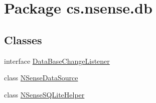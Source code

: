 \hypertarget{namespacecs_1_1nsense_1_1db}{\section{Package cs.\-nsense.\-db}
\label{namespacecs_1_1nsense_1_1db}
}
\subsection*{Classes}
\begin{DoxyCompactItemize}
\item 
interface \hyperlink{interfacecs_1_1nsense_1_1db_1_1_data_base_change_listener}{Data\-Base\-Change\-Listener}
\item 
class \hyperlink{classcs_1_1nsense_1_1db_1_1_n_sense_data_source}{N\-Sense\-Data\-Source}
\item 
class \hyperlink{classcs_1_1nsense_1_1db_1_1_n_sense_s_q_lite_helper}{N\-Sense\-S\-Q\-Lite\-Helper}
\end{DoxyCompactItemize}


